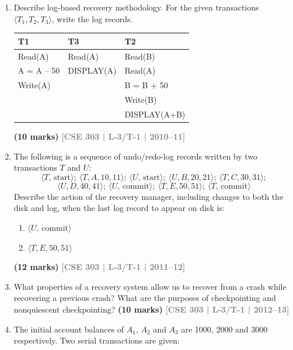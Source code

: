 \documentclass[12pt,a3paper]{article}
\newcommand{\yr}[1]{\hfill\textcolor{gray}{\small\textbf{[#1]}}}
\newcommand{\mk}[1]{\textcolor{orange!70!black}{\small\textbf{(#1 marks)}}}
\begin{document}
\begin{enumerate}

\item Describe log-based recovery methodology. For the given transactions $\langle T_1, T_2, T_3 \rangle$, write the log records.

\medskip
\begin{center}
\begin{tabular}{lll}
\toprule
\textbf{T1} & \textbf{T3} & \textbf{T2}\\
\midrule
Read(A)      & Read(A)     & Read(B)\\
A = A -- 50  & DISPLAY(A)  & Read(A)\\
Write(A)     &             & B = B + 50\\
             &             & Write(B)\\
             &             & DISPLAY(A+B)\\
\bottomrule
\end{tabular}
\end{center}
\mk{10} \yr{CSE 303 | L-3/T-1 | 2010--11}

\item The following is a sequence of undo/redo-log records written by two transactions $T$ and $U$:
\[\langle T,\,\text{start}\rangle;\ \langle T,A,10,11\rangle;\ \langle U,\,\text{start}\rangle;\ \langle U,B,20,21\rangle;\ \langle T,C,30,31\rangle;\]
\[\langle U,D,40,41\rangle;\ \langle U,\,\text{commit}\rangle;\ \langle T,E,50,51\rangle;\ \langle T,\,\text{commit}\rangle\]
Describe the action of the recovery manager, including changes to both the disk and log, when the last log record to appear on disk is:
\begin{enumerate}
  \item $\langle U,\,\text{commit}\rangle$
  \item $\langle T,E,50,51\rangle$
\end{enumerate}
  \mk{12} \yr{CSE 303 | L-3/T-1 | 2011--12}

\item What properties of a recovery system allow us to recover from a crash while recovering a previous crash? What are the purposes of checkpointing and nonquiescent checkpointing?
\mk{10} \yr{CSE 303 | L-3/T-1 | 2012--13}

\item The initial account balances of $A_1$, $A_2$ and $A_3$ are 1000, 2000 and 3000 respectively. Two serial transactions are given:


\end{enumerate}
\end{document}
